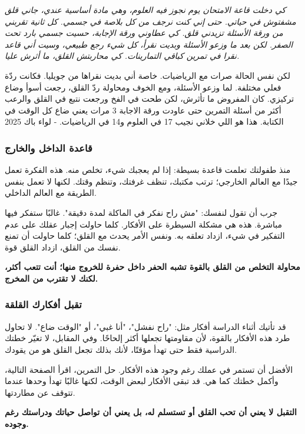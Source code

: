 \documentclass[12pt,a4paper]{book}
\newcommand{\quoteAr}[1]{%
	\begin{myquote}
		\itshape #1
	\end{myquote}
}
\newcommand{\importantAr}[1]{%
	\begin{important}
		\bfseries #1
	\end{important}
}
\begin{document}
	\quoteAr{كي دخلت قاعة الامتحان يوم نجوز فيه العلوم، وهي مادة أساسية عندي، جاني قلق مشفتوش في حياتي. حتى إني كنت نرجف من كل بلاصة في جسمي. كل ثانية تقربني من ورقة الأسئلة تزيدني قلق. كي عطاوني ورقة الإجابة، حسيت جسمي بارد تحت الصفر. لكن بعد ما وزعو الأسئلة وبديت نقرأ، كل شيء رجع طبيعي، وسيت أني قاعد نقرا في تمرين كباقي التمارينات. كي محاربتش القلق، ما أثرش عليا.
		
		لكن نفس الحالة صرات مع الرياضيات. خاصة أني بديت نقراها من جويليا. فكانت ردّة فعلي مختلفة. لما وزعو الأسئلة، ومع الخوف ومحاولة ردّ القلق، رجعت أسوأ وضاع تركيزي. كان المفروض ما تأثرش، لكن طحت في الفخ ورجعت نتبع في القلق والرعب أكثر من أسئلة التمرين حتى عاودت ورقة الاجابة 3 مرات يعني ضاع كل الوقت في الكتابة. هذا هو اللي خلاني نجيب 17 في العلوم و14 في الرياضيات. - لواء باك 2025}
	
	\subsubsection*{قاعدة الداخل والخارج}
	
	منذ طفولتك تعلمت قاعدة بسيطة: إذا لم يعجبك شيء، تخلص منه. هذه الفكرة تعمل جيدًا مع العالم الخارجي؛ ترتب مكتبك، تنظف غرفتك، وتنظم وقتك. لكنها لا تعمل بنفس الطريقة مع العالم الداخلي.
	
	جرب أن تقول لنفسك: "مش راح نفكر في الماكلة لمدة دقيقة". غالبًا ستفكر فيها مباشرة. هذه هي مشكلة السيطرة على الأفكار. كلما حاولت إجبار عقلك على عدم التفكير في شيء، ازداد تعلقه به. ونفس الأمر يحدث مع القلق؛ كلما حاولت أن تمنع نفسك من القلق، ازداد القلق قوة.
	
	\importantAr{محاولة التخلص من القلق بالقوة تشبه الحفر داخل حفرة للخروج منها؛ أنت تتعب أكثر، لكنك لا تقترب من المخرج.}
	
	\subsubsection*{تقبل أفكارك القلقة}
	
	قد تأتيك أثناء الدراسة أفكار مثل: "راح نفشل"، "أنا غبي"، أو "الوقت ضاع". لا تحاول طرد هذه الأفكار بالقوة، لأن مقاومتها تجعلها أكثر إلحاحًا. وفي المقابل، لا تغيّر خطتك الدراسية فقط حتى تهدأ مؤقتًا، لأنك بذلك تجعل القلق هو من يقودك.
	
	الأفضل أن تستمر في عملك رغم وجود هذه الأفكار. حل التمرين، اقرأ الصفحة التالية، وأكمل خطتك كما هي. قد تبقى الأفكار لبعض الوقت، لكنها غالبًا تهدأ وحدها عندما تتوقف عن مطاردتها.
	
	\importantAr{التقبل لا يعني أن تحب القلق أو تستسلم له، بل يعني أن تواصل حياتك ودراستك رغم وجوده.}
	
\end{document}
